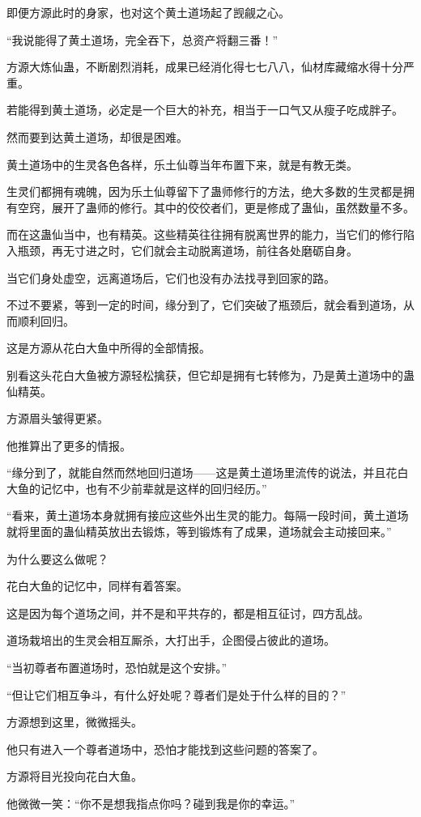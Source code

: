 \begin{this_body}
即便方源此时的身家，也对这个黄土道场起了觊觎之心。

“我说能得了黄土道场，完全吞下，总资产将翻三番！”

方源大炼仙蛊，不断剧烈消耗，成果已经消化得七七八八，仙材库藏缩水得十分严重。

若能得到黄土道场，必定是一个巨大的补充，相当于一口气又从瘦子吃成胖子。

然而要到达黄土道场，却很是困难。

黄土道场中的生灵各色各样，乐土仙尊当年布置下来，就是有教无类。

生灵们都拥有魂魄，因为乐土仙尊留下了蛊师修行的方法，绝大多数的生灵都是拥有空窍，展开了蛊师的修行。其中的佼佼者们，更是修成了蛊仙，虽然数量不多。

而在这蛊仙当中，也有精英。这些精英往往拥有脱离世界的能力，当它们的修行陷入瓶颈，再无寸进之时，它们就会主动脱离道场，前往各处磨砺自身。

当它们身处虚空，远离道场后，它们也没有办法找寻到回家的路。

不过不要紧，等到一定的时间，缘分到了，它们突破了瓶颈后，就会看到道场，从而顺利回归。

这是方源从花白大鱼中所得的全部情报。

别看这头花白大鱼被方源轻松擒获，但它却是拥有七转修为，乃是黄土道场中的蛊仙精英。

方源眉头皱得更紧。

他推算出了更多的情报。

“缘分到了，就能自然而然地回归道场——这是黄土道场里流传的说法，并且花白大鱼的记忆中，也有不少前辈就是这样的回归经历。”

“看来，黄土道场本身就拥有接应这些外出生灵的能力。每隔一段时间，黄土道场就将里面的蛊仙精英放出去锻炼，等到锻炼有了成果，道场就会主动接回来。”

为什么要这么做呢？

花白大鱼的记忆中，同样有着答案。

这是因为每个道场之间，并不是和平共存的，都是相互征讨，四方乱战。

道场栽培出的生灵会相互厮杀，大打出手，企图侵占彼此的道场。

“当初尊者布置道场时，恐怕就是这个安排。”

“但让它们相互争斗，有什么好处呢？尊者们是处于什么样的目的？”

方源想到这里，微微摇头。

他只有进入一个尊者道场中，恐怕才能找到这些问题的答案了。

方源将目光投向花白大鱼。

他微微一笑：“你不是想我指点你吗？碰到我是你的幸运。”


\end{this_body}
